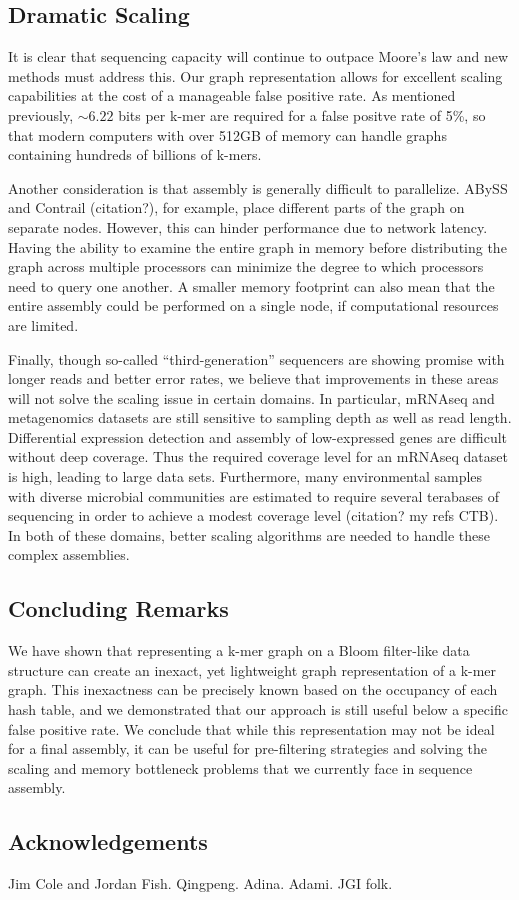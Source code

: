 \documentclass[12pt]{article} \usepackage{simplemargins}
\begin{document}
\subsection{Dramatic Scaling}
It is clear that sequencing capacity will continue to outpace Moore's 
law and new methods must address this. Our graph representation allows 
for excellent scaling capabilities at the cost of a manageable false positive rate. 
As mentioned previously, $\sim 6.22$ bits per k-mer are required for a 
false positve rate of 5\%, so that modern computers with 
over 512GB of memory can handle graphs containing hundreds of billions of k-mers.

Another consideration is that assembly is generally difficult to parallelize. 
ABySS and Contrail (citation?), for example, place different parts of the 
graph on separate nodes. However, this can hinder performance due to 
network latency. Having the ability to examine the entire graph in memory 
before distributing the graph across multiple processors can minimize the
degree to which processors need to query one another. A smaller memory 
footprint can also mean that the entire assembly could be performed on 
a single node, if computational resources are limited.

Finally, though so-called ``third-generation'' sequencers are showing promise with 
longer reads and better error rates, we believe that improvements in these 
areas will not solve the scaling issue in certain domains. In particular, 
mRNAseq and metagenomics datasets are still sensitive to sampling depth as
well as read length. Differential expression detection and assembly 
of low-expressed genes are difficult without deep coverage. Thus
the required coverage level for an mRNAseq dataset is high, leading to large
data sets. Furthermore, many environmental samples with 
diverse microbial communities are estimated to require several terabases of sequencing 
in order to achieve a modest coverage level (citation?  my refs CTB). In both of these domains, better 
scaling algorithms are needed to handle these complex assemblies. 

\subsection{Concluding Remarks}
We have shown that representing a k-mer graph on a Bloom filter-like data 
structure can create an inexact, yet lightweight graph representation of 
a k-mer graph. This inexactness can be precisely known based on the occupancy 
of each hash table, and we demonstrated that our approach is still useful 
below a specific false positive rate. We conclude that while this representation 
may not be ideal for a final assembly, it can be useful for pre-filtering 
strategies and solving the scaling and memory bottleneck problems that we 
currently face in sequence assembly.

\subsection{Acknowledgements}

Jim Cole and Jordan Fish.  Qingpeng.  Adina.  Adami.  JGI folk.



\end{document}
